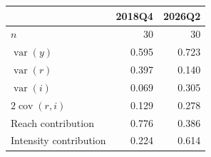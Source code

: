 \begin{tabular}{@{}l r r@{}}
\toprule
 & 2018Q4 & 2026Q2 \\
\midrule
$n$ & 30 & 30 \\
$\operatorname{var}(y)$ & 0.595 & 0.723 \\
$\operatorname{var}(r)$ & 0.397 & 0.140 \\
$\operatorname{var}(i)$ & 0.069 & 0.305 \\
$2\operatorname{cov}(r,i)$ & 0.129 & 0.278 \\
Reach contribution & 0.776 & 0.386 \\
Intensity contribution & 0.224 & 0.614 \\
\bottomrule
\end{tabular}
